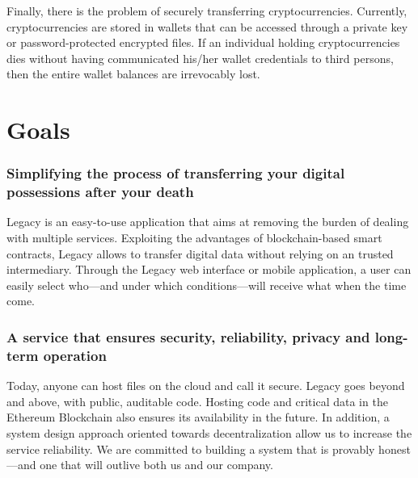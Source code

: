 Finally, there is the problem of securely transferring cryptocurrencies. Currently, cryptocurrencies are stored in wallets that can be accessed through a private key or password-protected encrypted files. If an individual holding cryptocurrencies dies without having communicated his/her wallet credentials to third persons, then the entire wallet balances are irrevocably lost. 


\section{Goals} %
\label{sec:goals}

\subsubsection*{Simplifying the process of transferring your digital possessions after your death} %
\label{ssub:simplifying_the_process_of_transferring_your_digital_possessions_after_your_death}
Legacy is an easy-to-use application that aims at removing the burden of dealing with multiple services. Exploiting the advantages of blockchain-based smart contracts, Legacy allows to transfer digital data without relying on an trusted intermediary.  
Through the Legacy web interface or mobile application, a user can easily select who---and under which conditions---will receive what when the time come.

\subsubsection*{A service that ensures security, reliability, privacy and long-term operation} %
\label{ssub:a_service_that_ensures_security_reliability_privacy_and_long_term_operation}
Today, anyone can host files on the cloud and call it secure. Legacy goes beyond and above, with public, auditable code. Hosting code and critical data in the Ethereum Blockchain also ensures its availability in the future. In addition, a system design approach oriented towards decentralization allow us to increase the service reliability.
We are committed to building a system that is provably honest---and one that will outlive both us and our company.

